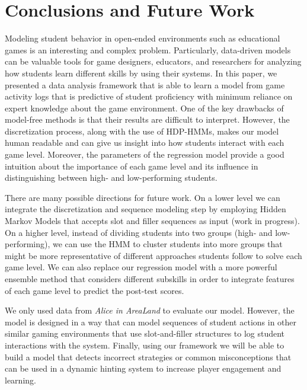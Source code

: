 \documentclass{sigchi}
\begin{document}
	\section{Conclusions and Future Work}
	\label{sec:conclusion} 
	
	Modeling student behavior in open-ended environments such as educational games is an interesting and complex problem. 
	Particularly, data-driven models can be valuable tools for game designers, educators, and researchers for analyzing how students learn different skills by using their systems.
	In this paper, we presented a data analysis framework that is able to learn a model from game activity logs that is predictive of student proficiency with minimum reliance on expert knowledge about the game environment. 
	One of the key drawbacks of model-free methods is that their results are difficult to interpret. 
	However, the discretization process, along with the use of HDP-HMMs, makes our model human readable and can give us insight into how students interact with each game level.
	Moreover, the parameters of the regression model provide a good intuition about the importance of each game level and its influence in distinguishing between high- and low-performing students.
	
	There are many possible directions for future work. On a lower level we can integrate the discretization and sequence modeling step by employing Hidden Markov Models that accepts slot and filler sequences as input (work in progress). On a higher level, instead of dividing students into two groups (high- and low-performing), we can use the HMM to cluster students \cite{bicego2003similarity,smyth1997clustering} into more groups that might be  more representative of different approaches students follow to solve each game level. We can also replace our regression model with a more powerful ensemble method that considers different subskills in order to integrate features of each game level to predict the post-test scores.
	
	We only used data from \textit{Alice in AreaLand} to evaluate our model. However, the model is designed in a way that can model sequences of student actions in other similar gaming environments that use slot-and-filler structures to log student interactions with the system. Finally, using our framework we will be able to build a model that detects incorrect strategies or common misconceptions that can be used in a dynamic hinting system to increase player engagement and learning.
	
	
	
	\balance
	
	
\end{document}
